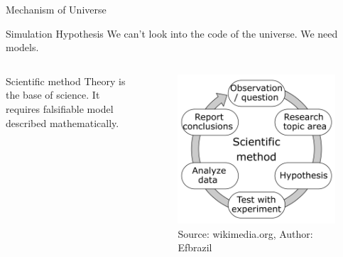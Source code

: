 \documentclass[xcolor]{beamer}
\begin{document}
\begin{frame}{Mechanism of Universe}
\begin{block}{Simulation Hypothesis}
We can't look into the code of the universe. We need models.
\end{block}

\begin{columns}
\begin{column}{0.5\textwidth}
\begin{block}{Scientific method}
Theory is the base of science. It requires falsifiable model described mathematically.
\end{block}
\end{column}

\begin{column}{0.5\textwidth}
\begin{figure}
\includegraphics[width=\textwidth]{The_Scientific_Method.png}
\caption{Source: wikimedia.org, Author: Efbrazil}
\end{figure}
\end{column}
\end{columns}
\end{frame}
\end{document}
